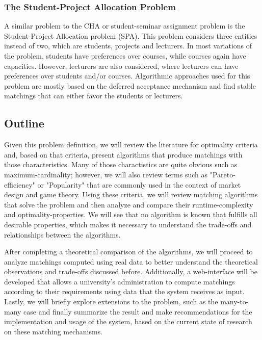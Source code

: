\subsubsection{The Student-Project Allocation Problem}
A similar problem to the CHA or student-seminar assignment problem is the Student-Project Allocation problem (SPA). This problem considers three entities instead of two, which are students, projects and lecturers. In most variations of the problem, students have preferences over courses, while courses again have capacities. However, lecturers are also considered, where lecturers can have preferences over students and/or courses. Algorithmic approaches used for this problem are mostly based on the deferred acceptance mechanism and find stable matchings that can either favor the students or lecturers.\cite{algorithmics} 

\subsection{Outline}
Given this problem definition, we will review the literature for optimality criteria and, based on that criteria, present algorithms that produce matchings with those characteristics. Many of those charactistics are quite obvious such as maximum-cardinality; however, we will also review terms such as "Pareto-efficiency" or "Popularity" that are commonly used in the context of market design and game theory. 
Using these criteria, we will review matching algorithms that solve the problem and then analyze and compare their runtime-complexity and optimality-properties. We will see that no algorithm is known that fulfills all desirable properties, which makes it necessary to understand the trade-offs and relationships between the algorithms. 

After completing a theoretical comparison of the algorithms, we will proceed to analyze matchings computed using real data to better understand the theoretical observations and trade-offs discussed before. Additionally, a web-interface will be developed that allows a university's administration to compute matchings according to their requirements using data that the system receives as input. Lastly, we will briefly explore extensions to the problem, such as the many-to-many case and finally summarize the result and make recommendations for the implementation and usage of the system, based on the current state of research on these matching mechanisms.